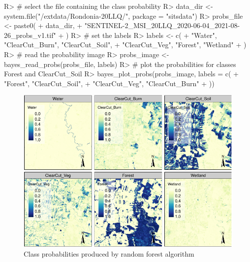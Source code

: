 \documentclass[
  shortnames]{jss}
\begin{document}
\begin{CodeChunk}
\begin{CodeInput}
R> # select the file containing the class probability
R> data_dir <- system.file("/extdata/Rondonia-20LLQ/", package = "sitsdata")
R> probs_file <- paste0(
+   data_dir,
+   "SENTINEL-2_MSI_20LLQ_2020-06-04_2021-08-26_probs_v1.tif"
+ )
R> # set the labels
R> labels <- c(
+   "Water", "ClearCut_Burn", "ClearCut_Soil",
+   "ClearCut_Veg", "Forest", "Wetland"
+ )
R> # read the probability image
R> probs_image <- bayes_read_probs(probs_file, labels)
R> # plot the probabilities for classes Forest and ClearCut_Soil
R> bayes_plot_probs(probs_image, labels = c(
+   "Forest", "ClearCut_Soil",
+   "ClearCut_Veg", "ClearCut_Burn"
+ ))
\end{CodeInput}
\begin{figure}[h]

{\centering \includegraphics{Bayesian_smoothing_JSS_files/figure-latex/pcube-1} 

}

\caption[Class probabilities produced by random forest algorithm]{Class probabilities produced by random forest algorithm}\label{fig:pcube}
\end{figure}
\end{CodeChunk}
\end{document}
